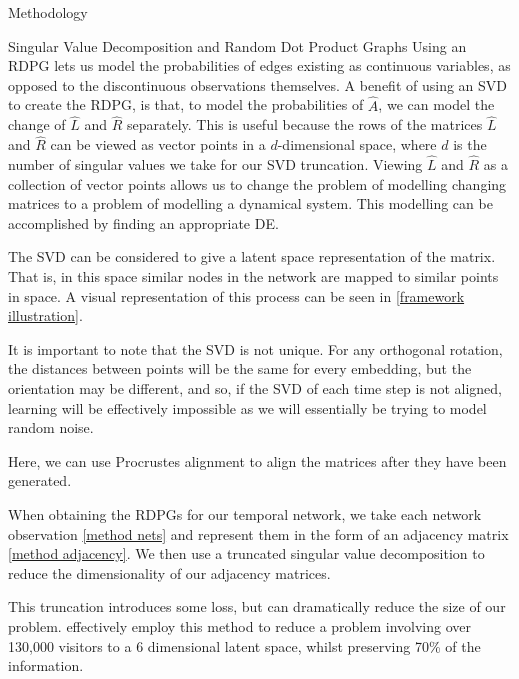 \documentclass[12pt]{amsbook}
\begin{document}
\begin{chapter}{Methodology}
\begin{section}{Singular Value Decomposition and Random Dot Product Graphs}
        Using an RDPG lets us model the probabilities of edges existing as continuous variables, as opposed to the discontinuous observations themselves. A benefit of using an SVD to create the RDPG, is that, to model the probabilities of $\hat A$, we can model the change of $\hat L$ and $\hat R$ separately. This is useful because the rows of the matrices $\hat L$ and $\hat R$ can be viewed as vector points in a $d$-dimensional space, where $d$ is the number of singular values we take for our SVD truncation. Viewing $\hat L$ and $\hat R$ as a collection of vector points allows us to change the problem of modelling changing matrices to a problem of modelling a dynamical system. This modelling can be accomplished by finding an appropriate DE.

        
        The SVD can be considered to give a latent space representation of the matrix\cite{hoff2002latent}. That is, in this space similar nodes in the network are mapped to similar points in space. A visual representation of this process can be seen in \cref{framework illustration}. 

        It is important to note that the SVD is not unique. For any orthogonal rotation, the distances between points will be the same for every embedding, but the orientation may be different, and so, if the SVD of each time step is not aligned, learning will be effectively impossible as we will essentially be trying to model random noise. 

        Here, we can use Procrustes alignment\cite{DotProductGraphs} to align the matrices after they have been generated.
        
        When obtaining the RDPGs for our temporal network, we take each network observation \cref{method nets} and represent them in the form of an adjacency matrix \cref{method adjacency}. We then use a truncated singular value decomposition to reduce the dimensionality of our adjacency matrices\cite{golub1971singular}. 
        
        This truncation introduces some loss, but can dramatically reduce the size of our problem. \cite{Runghen2021} effectively employ this method to reduce a problem involving over 130,000 visitors to a 6 dimensional latent space, whilst preserving 70\% of the information.


\end{section}
\end{chapter}
\end{document}

